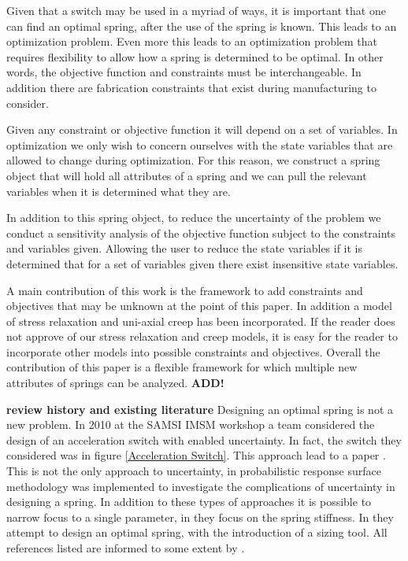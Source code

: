 \documentclass[10pt]{article}
\begin{document}
Given that a switch may be used in a myriad of ways, it is important that one can find an optimal spring, after the use of the spring is known. This leads to an optimization problem. Even more this leads to an optimization problem that requires flexibility to allow how a spring is determined to be optimal. In other words, the objective function and constraints must be interchangeable. In addition there are fabrication constraints that exist during manufacturing to consider.  

Given any constraint or objective function it will depend on a set of variables. In optimization we only wish to concern ourselves with the state variables that are allowed to change during optimization. For this reason, we construct a spring object that will hold all attributes of a spring and we can pull the relevant variables when it is determined what they are. 

In addition to this spring object, to reduce the uncertainty of the problem we conduct a sensitivity analysis of the objective function subject to the constraints and variables given. Allowing the user to reduce the state variables if it is determined that for a set of variables given there exist insensitive state variables. 

A main contribution of this work is the framework to add constraints and objectives that may be unknown at the point of this paper. In addition a model of stress relaxation and uni-axial creep has been incorporated. If the reader does not approve of our stress relaxation and creep models, it is easy for the reader to incorporate other models into possible constraints and objectives. Overall the contribution of this paper is a flexible framework for which multiple new attributes of springs can be analyzed.
\textbf{ADD!}


\textbf{review history and existing literature}
Designing an optimal spring is not a new problem. In 2010 at the SAMSI IMSM workshop a team considered the design of an acceleration switch with enabled uncertainty. In fact, the switch they considered was in figure \ref{Acceleration Switch}. This approach lead to a paper \cite{IMSM2010}. This is not the only approach to uncertainty, in \cite{Reliability} probabilistic response surface methodology was implemented to investigate the complications of uncertainty in designing a spring. In addition to these types of approaches it is possible to narrow focus to a single parameter, in \cite{Robust} they focus on the spring stiffness. In \cite{Paredes} they attempt to design an optimal spring, with the introduction of a sizing tool. All references listed are informed to some extent by \cite{Wahl}. 
\end{document}

